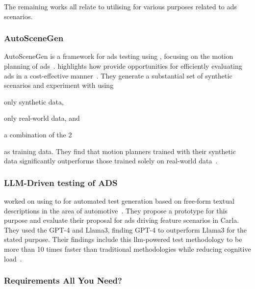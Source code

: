 The remaining works all relate to utilising  for various purposes related to
\acrshort{ads} scenarios.

\subsubsection{AutoSceneGen}\label{sec:autoSceneGen}

AutoSceneGen is a framework for \acrshort{ads} testing using ,
focusing on the motion planning of \acrlong{ads}~\cite[14539]{autoSceneGen}.
\citeauthor{autoSceneGen} highlights how  provide opportunities
for efficiently evaluating \acrshort{ads} in a cost-effective
manner~\cite[14539-14540]{autoSceneGen}. They generate a substantial set of synthetic scenarios and
experiment with using \begin{inparaenum}
    \item only synthetic data,
    \item only real-world data, and
    \item a combination of the \num{2} \end{inparaenum} as training data. They find that motion
planners trained with their synthetic data significantly outperforms those trained solely on
real-world data~\cite[14539]{autoSceneGen}.

\subsubsection{LLM-Driven testing of ADS}%

\citeauthor{LLMDrivenTestingADS24} worked on using  to for automated test generation
based on free-form textual descriptions in the area of automotive~\cite[173]{LLMDrivenTestingADS24}.
They propose a prototype for this purpose and evaluate their proposal for \acrshort{ads} driving
feature scenarios in Carla. They used the  GPT-4 and Llama3, finding GPT-4 to
outperform Llama3 for the stated purpose. Their findings include this \acrshort{llm}-powered test
methodology to be more than \num{10} times faster than traditional methodologies while reducing
cognitive load~\cite[173]{LLMDrivenTestingADS24}.

\subsubsection{Requirements All You Need?}

